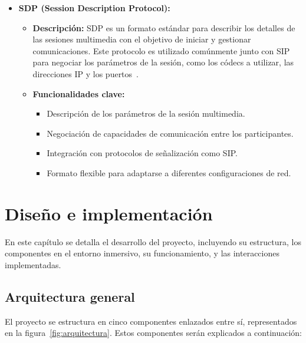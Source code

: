 \documentclass[a4paper, 12pt]{book}
\begin{document}
\begin{itemize}
  \item \textbf{SDP (Session Description Protocol):}
    \begin{itemize}
      \item \textbf{Descripción:} SDP es un formato estándar para describir los detalles de las sesiones multimedia con el objetivo de iniciar y gestionar comunicaciones. 
      Este protocolo es utilizado comúnmente junto con SIP para negociar los parámetros de la sesión, como los códecs a utilizar, 
      las direcciones IP y los puertos~\cite{Documentacion_SDP}.
      \item \textbf{Funcionalidades clave:}
      \begin{itemize}
        \item Descripción de los parámetros de la sesión multimedia.
        \item Negociación de capacidades de comunicación entre los participantes.
        \item Integración con protocolos de señalización como SIP.
        \item Formato flexible para adaptarse a diferentes configuraciones de red.
      \end{itemize}
    \end{itemize}
  
\end{itemize}




\cleardoublepage
\chapter{Diseño e implementación}
\label{chap:diseno}

En este capítulo se detalla el desarrollo del proyecto, incluyendo su estructura, los componentes en el entorno 
inmersivo, su funcionamiento, y las interacciones implementadas.


\section{Arquitectura general} 
\label{sec:arquitectura}

El proyecto se estructura en cinco componentes enlazados entre sí, representados en la figura~\ref{fig:arquitectura}. Estos componentes serán explicados a continuación:
\end{document}

